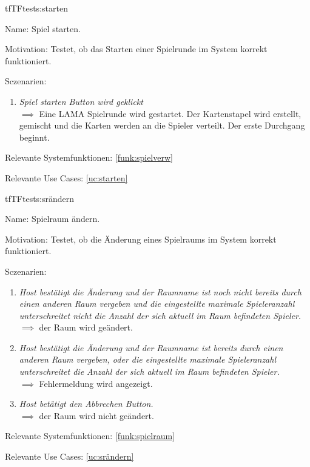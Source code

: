 \begin{description}[leftmargin=5em, style=sameline]
{
\begin{lhp}{tf}{TF}{tests:starten}
	\item [Name:] Spiel starten.
	\item [Motivation:] Testet, ob das Starten einer Spielrunde im System korrekt funktioniert.
	\item [Sczenarien:] \hfill
		\begin{enumerate}
			\item \textit{Spiel starten Button wird geklickt} \\ $\implies$ Eine LAMA Spielrunde wird gestartet. Der Kartenstapel wird erstellt, gemischt und die Karten werden an die Spieler verteilt. Der erste Durchgang beginnt.
		\end{enumerate}
	\item [Relevante Systemfunktionen:] \ref{funk:spielverw}
	\item [Relevante Use Cases:] \ref{uc:starten}
\end{lhp}
}


{
\begin{lhp}{tf}{TF}{tests:srändern}
	\item [Name:] Spielraum ändern.
	\item [Motivation:] Testet, ob die Änderung eines Spielraums im System korrekt funktioniert.
	\item [Sczenarien:] \hfill
		\begin{enumerate}

            \item \textit{Host bestätigt die Änderung und der Raumname ist noch nicht bereits durch einen anderen Raum vergeben und die eingestellte maximale Spieleranzahl unterschreitet nicht die Anzahl der sich aktuell im Raum befindeten Spieler.} \\ $\implies$ der Raum wird geändert.
			\item \textit{Host bestätigt die Änderung und der Raumname ist bereits durch einen anderen Raum vergeben, oder die eingestellte maximale Spieleranzahl unterschreitet die Anzahl der sich aktuell im Raum befindeten Spieler.} \\ $\implies$ Fehlermeldung wird angezeigt.
			\item \textit{Host betätigt den Abbrechen Button.} \\ $\implies$ der Raum wird nicht geändert.
		\end{enumerate}
	\item [Relevante Systemfunktionen:] \ref{funk:spielraum}
	\item [Relevante Use Cases:] \ref{uc:srändern}
\end{lhp}
}



\end{description}
